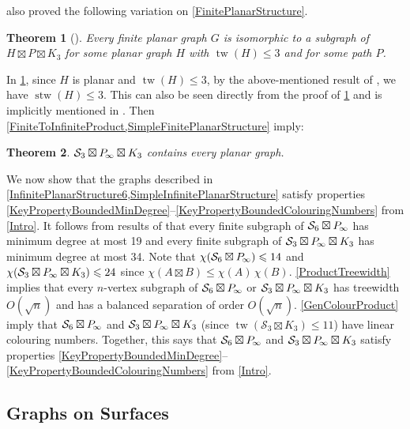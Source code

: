 \documentclass[a4paper,11pt]{article}
\theoremstyle{plain}
\newtheorem{thm}{Theorem}[section]
\theoremstyle{definition}
\renewcommand{\leq}{\leqslant}
\DeclareMathOperator{\tw}{tw}
\DeclareMathOperator{\stw}{stw}
\newcommand{\PP}{P_{\hspace{-0.25ex}\infty}}
\renewcommand{\SS}{\mathcal{S}}
\begin{document}
\citet{DJMMUW20} also proved the following variation on \cref{FinitePlanarStructure}. 

\begin{thm}[\citep{DJMMUW20}]
\label{SimpleFinitePlanarStructure}
Every finite planar graph $G$ is isomorphic to a subgraph of $H\boxtimes P \boxtimes K_3$ for some planar graph $H$ with $\tw(H)\leq 3$ and for some path $P$. 
\end{thm}

In \cref{SimpleFinitePlanarStructure}, since $H$ is planar and $\tw(H)\leq 3$, by the above-mentioned result of \citet{KV12}, we have $\stw(H)\leq 3$. This can also be seen directly from the proof of \cref{SimpleFinitePlanarStructure} and is implicitly mentioned in \citep{DJMMUW20}. Then \cref{FiniteToInfiniteProduct,SimpleFinitePlanarStructure} imply:

\begin{thm}
\label{SimpleInfinitePlanarStructure}
$\SS_3\boxtimes \PP \boxtimes K_3$ contains every planar graph.
\end{thm}

We now show that the graphs described in \cref{InfinitePlanarStructure6,SimpleInfinitePlanarStructure} satisfy properties \cref{KeyPropertyBoundedMinDegree}--\cref{KeyPropertyBoundedColouringNumbers} from \cref{Intro}. It follows from results of \citet{HW21} that every finite subgraph of $\SS_6\boxtimes \PP$ has minimum degree at most 19 and 
every finite subgraph of $\SS_3\boxtimes \PP \boxtimes K_3$ has minimum degree at most 34. Note that $\chi( \SS_6\boxtimes \PP) \leq 14$ and $\chi(\SS_3\boxtimes \PP \boxtimes K_3)\leq 24$ since $\chi(A\boxtimes B) \leq \chi(A)\,\chi(B)$. 
\cref{ProductTreewidth} implies that every $n$-vertex subgraph of  $\SS_6 \boxtimes \PP$ or $\SS_3\boxtimes \PP \boxtimes K_3$ has treewidth $O(\sqrt{n})$ and has a balanced separation of order $O(\sqrt{n})$.  \cref{GenColourProduct} imply that  $\SS_6 \boxtimes \PP$ and $\SS_3\boxtimes \PP \boxtimes K_3$ (since $\tw(\SS_3\boxtimes K_3)\leq 11$) have linear  colouring numbers. Together, this says that $\SS_6 \boxtimes \PP$ and $\SS_3\boxtimes \PP \boxtimes K_3$ satisfy properties \cref{KeyPropertyBoundedMinDegree}--\cref{KeyPropertyBoundedColouringNumbers} from \cref{Intro}.

\subsection{Graphs on Surfaces}
\label{Genus}
\end{document}
